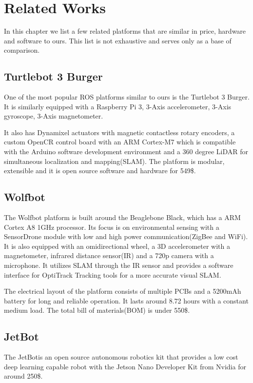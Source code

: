 \documentclass[class=report, crop=false]{standalone}
\begin{document}
\chapter{Related Works}\label{cha:related-works}
\pagestyle{scrheadings}
In this chapter we list a few related platforms that are similar in price, hardware and software to ours. This list is not exhaustive and serves only as a base of comparison.


\section{Turtlebot 3 Burger}\label{sec:turtlebot3burger}
One of the most popular ROS platforms similar to ours is the Turtlebot 3 Burger\footnotemark. It is similarly equipped with a Raspberry Pi 3, 3-Axis accelerometer, 3-Axis gyroscope, 3-Axis magnetometer.

It also has Dynamixel actuators with magnetic contactless rotary encoders, a custom OpenCR control board with an ARM Cortex-M7 which is compatible with the Arduino software development environment and a 360 degree LiDAR for simultaneous localization and mapping(SLAM).
The platform is modular, extensible and it is open source software and hardware for 549\$\cite{turtlebot3}.


\section{Wolfbot}\label{sec:wolfbot}
The Wolfbot\cite{wolfbot} platform is built around the Beaglebone Black, which has a ARM Cortex A8 1GHz processor. Its focus is on environmental sensing with a SensorDrone module with low and high power communication(ZigBee and WiFi). It is also equipped with an omidirectional wheel, a 3D accelerometer with a magnetometer, infrared distance sensor(IR) and a 720p camera with a microphone. It utilizes SLAM through the IR sensor and provides a software interface for OptiTrack Tracking tools for a more accurate visual SLAM.

The electrical layout of the platform consists of multiple PCBs and a 5200mAh battery for long and reliable operation. It lasts around 8.72 hours with a constant medium load. The total bill of materials(BOM) is under 550\$.

\section{JetBot}\label{sec:jetbot}
The JetBot\footnotemark is an open source autonomous robotics kit that provides a low cost deep learning capable robot with the Jetson Nano Developer Kit from Nvidia for around 250\$.
\end{document}
